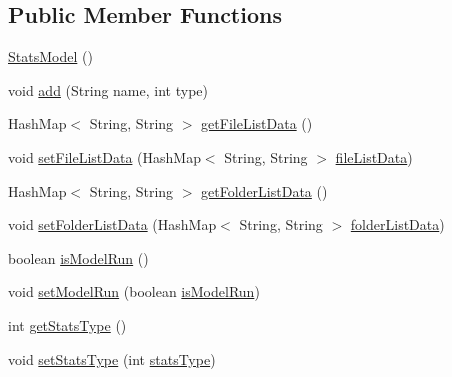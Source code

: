 \subsection*{Public Member Functions}
\begin{DoxyCompactItemize}
\item 
\hyperlink{classcom_1_1poly_1_1nlp_1_1filekommander_1_1views_1_1models_1_1_stats_model_ad9f68ae44bc497146b2a16739d8e813a}{Stats\-Model} ()
\item 
void \hyperlink{classcom_1_1poly_1_1nlp_1_1filekommander_1_1views_1_1models_1_1_stats_model_a8a94771595dee19a6f1a74ff2f7483ea}{add} (String name, int type)
\item 
Hash\-Map$<$ String, String $>$ \hyperlink{classcom_1_1poly_1_1nlp_1_1filekommander_1_1views_1_1models_1_1_stats_model_abf285e0acda3ac3a582abda3bbf12987}{get\-File\-List\-Data} ()
\item 
void \hyperlink{classcom_1_1poly_1_1nlp_1_1filekommander_1_1views_1_1models_1_1_stats_model_a1d12652c69c4ee9be652f41398f40dfc}{set\-File\-List\-Data} (Hash\-Map$<$ String, String $>$ \hyperlink{classcom_1_1poly_1_1nlp_1_1filekommander_1_1views_1_1models_1_1_stats_model_a7f136c002fe9865658d95f070a47fc10}{file\-List\-Data})
\item 
Hash\-Map$<$ String, String $>$ \hyperlink{classcom_1_1poly_1_1nlp_1_1filekommander_1_1views_1_1models_1_1_stats_model_ae617bfa56a1ba5572ecb0740e78b75ad}{get\-Folder\-List\-Data} ()
\item 
void \hyperlink{classcom_1_1poly_1_1nlp_1_1filekommander_1_1views_1_1models_1_1_stats_model_a3bbe0d0970f83fde99a8b147d4f05194}{set\-Folder\-List\-Data} (Hash\-Map$<$ String, String $>$ \hyperlink{classcom_1_1poly_1_1nlp_1_1filekommander_1_1views_1_1models_1_1_stats_model_af8cefc08e228065ab54db3f1f9db7b9e}{folder\-List\-Data})
\item 
boolean \hyperlink{classcom_1_1poly_1_1nlp_1_1filekommander_1_1views_1_1models_1_1_stats_model_ace0a90bc15597c72e7280488a730f05a}{is\-Model\-Run} ()
\item 
void \hyperlink{classcom_1_1poly_1_1nlp_1_1filekommander_1_1views_1_1models_1_1_stats_model_a4cad9a84d64d9fab3c3781f940a2bb99}{set\-Model\-Run} (boolean \hyperlink{classcom_1_1poly_1_1nlp_1_1filekommander_1_1views_1_1models_1_1_stats_model_a3ac8d8b82975c5631fc65f47121cbfe7}{is\-Model\-Run})
\item 
int \hyperlink{classcom_1_1poly_1_1nlp_1_1filekommander_1_1views_1_1models_1_1_stats_model_a6822c296eded108edbe0c34a71c3c97c}{get\-Stats\-Type} ()
\item 
void \hyperlink{classcom_1_1poly_1_1nlp_1_1filekommander_1_1views_1_1models_1_1_stats_model_a43a6e42897e03293403ffd1eaf9bad20}{set\-Stats\-Type} (int \hyperlink{classcom_1_1poly_1_1nlp_1_1filekommander_1_1views_1_1models_1_1_stats_model_aa8aff56dba5f42c2f1f1b0452a461d0a}{stats\-Type})
\end{DoxyCompactItemize}
